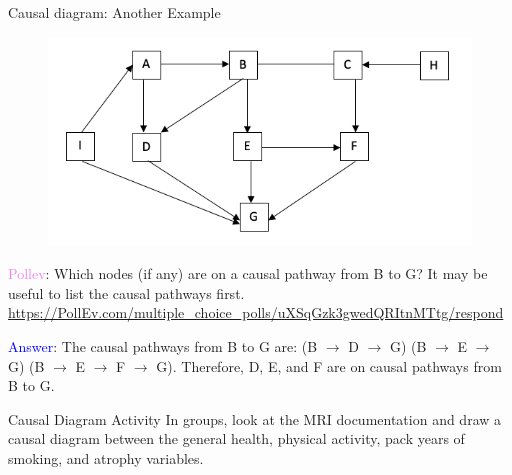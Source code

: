 \documentclass[10pt,t]{beamer}
\begin{document}
\begin{frame}{Causal diagram: Another Example}

\vspace{-5 mm}

\begin{figure}
	\centering \includegraphics[scale=0.4]{figures/dag1.png}
\end{figure}

\vspace{0.1cm} 

\textcolor{violet}{Pollev}: Which nodes (if any) are on a causal pathway from B to G? It may be useful to list the causal pathways first. 
{\scriptsize \url{https://PollEv.com/multiple_choice_polls/uXSqGzk3gwedQRItnMTtg/respond}}\pause

\vspace{0.2cm}

\textcolor{blue}{Answer}: The causal pathways from B to G are: (B $\to$ D $\to$ G) (B $\to$ E $\to$ G) (B $\to$ E $\to$ F $\to$ G). Therefore, D, E, and F are on causal pathways from B to G.

\end{frame}

\begin{frame}{Causal Diagram Activity}
	In groups, look at the MRI documentation and draw a causal diagram between the general health, physical activity, pack years of smoking, and atrophy variables. 
\end{frame}
\end{document}
